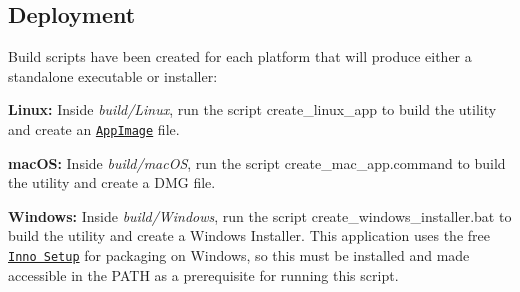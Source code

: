 \subsection*{Deployment}

Build scripts have been created for each platform that will produce either a standalone executable or installer\+:


\begin{DoxyItemize}
\item {\bfseries Linux\+:} Inside {\itshape build/\+Linux}, run the script {\ttfamily create\+\_\+linux\+\_\+app} to build the utility and create an \href{https://appimage.org}{\tt App\+Image} file.
\item {\bfseries mac\+OS\+:} Inside {\itshape build/mac\+OS}, run the script {\ttfamily create\+\_\+mac\+\_\+app.\+command} to build the utility and create a D\+MG file.
\item {\bfseries Windows\+:} Inside {\itshape build/\+Windows}, run the script {\ttfamily create\+\_\+windows\+\_\+installer.\+bat} to build the utility and create a Windows Installer. This application uses the free \href{http://www.jrsoftware.org/isinfo.php}{\tt Inno Setup} for packaging on Windows, so this must be installed and made accessible in the P\+A\+TH as a prerequisite for running this script. 
\end{DoxyItemize}